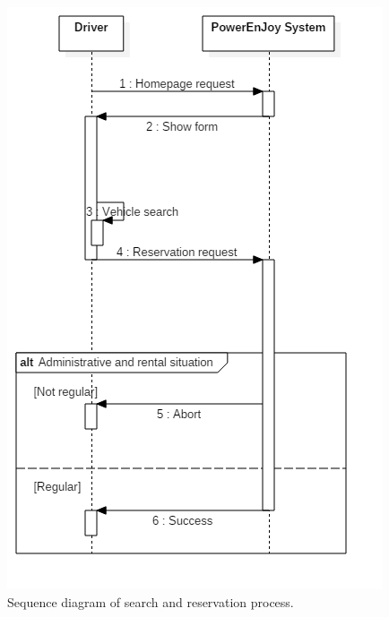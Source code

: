 \begin{figure}[H]
	\begin{center}
		\centering
		\includegraphics[height=0.9\textheight, keepaspectratio]{sequence_diagram/SearchReservation.png}
		\caption{Sequence diagram of search and reservation process.}
	\end{center}
\end{figure}


